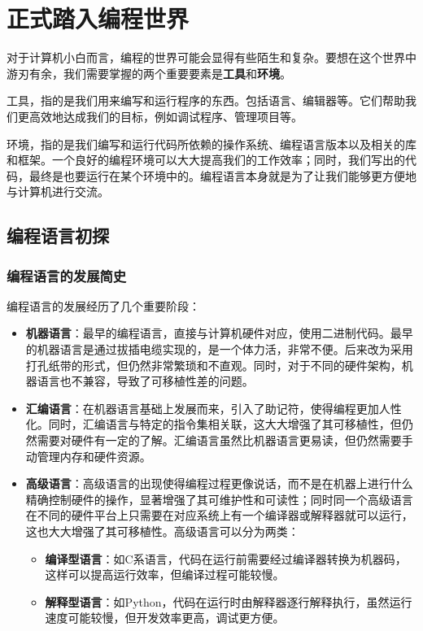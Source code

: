 \documentclass[../main.tex]{subfiles}
\begin{document}
\chapter{正式踏入编程世界}

对于计算机小白而言，编程的世界可能会显得有些陌生和复杂。要想在这个世界中游刃有余，我们需要掌握的两个重要要素是\textbf{工具}和\textbf{环境}。

工具，指的是我们用来编写和运行程序的东西。包括语言、编辑器等。它们帮助我们更高效地达成我们的目标，例如调试程序、管理项目等。

环境，指的是我们编写和运行代码所依赖的操作系统、编程语言版本以及相关的库和框架。一个良好的编程环境可以大大提高我们的工作效率；同时，我们写出的代码，最终是也要运行在某个环境中的。编程语言本身就是为了让我们能够更方便地与计算机进行交流。

\section{编程语言初探}

\subsection{编程语言的发展简史}

编程语言的发展经历了几个重要阶段：

\begin{itemize}
  \item \textbf{机器语言}：最早的编程语言，直接与计算机硬件对应，使用二进制代码。最早的机器语言是通过拔插电缆实现的，是一个体力活，非常不便。后来改为采用打孔纸带的形式，但仍然非常繁琐和不直观。同时，对于不同的硬件架构，机器语言也不兼容，导致了可移植性差的问题。
  \item \textbf{汇编语言}：在机器语言基础上发展而来，引入了助记符，使得编程更加人性化。同时，汇编语言与特定的指令集相关联，这大大增强了其可移植性，但仍然需要对硬件有一定的了解。汇编语言虽然比机器语言更易读，但仍然需要手动管理内存和硬件资源。
  \item \textbf{高级语言}：高级语言的出现使得编程过程更像说话，而不是在机器上进行什么精确控制硬件的操作，显著增强了其可维护性和可读性；同时同一个高级语言在不同的硬件平台上只需要在对应系统上有一个编译器或解释器就可以运行，这也大大增强了其可移植性。高级语言可以分为两类：
    \begin{itemize}
      \item \textbf{编译型语言}：如C系语言，代码在运行前需要经过编译器转换为机器码，这样可以提高运行效率，但编译过程可能较慢。
      \item \textbf{解释型语言}：如Python，代码在运行时由解释器逐行解释执行，虽然运行速度可能较慢，但开发效率更高，调试更方便。
    \end{itemize}
\end{itemize}
\end{document}

